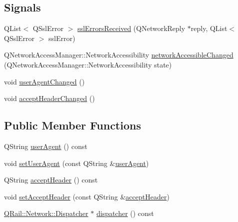 \subsection*{Signals}
\begin{DoxyCompactItemize}
\item 
Q\+List$<$ Q\+Ssl\+Error $>$ \mbox{\hyperlink{classQRail_1_1Network_1_1Manager_a0404bf0008a42108b6e72ec5da12d02f}{ssl\+Errors\+Received}} (Q\+Network\+Reply $\ast$reply, Q\+List$<$ Q\+Ssl\+Error $>$ ssl\+Error)
\item 
Q\+Network\+Access\+Manager\+::\+Network\+Accessibility \mbox{\hyperlink{classQRail_1_1Network_1_1Manager_af81d89d8572d74d039400ec2e05f9894}{network\+Accessible\+Changed}} (Q\+Network\+Access\+Manager\+::\+Network\+Accessibility state)
\item 
void \mbox{\hyperlink{classQRail_1_1Network_1_1Manager_a7041109a640094b8aaeb430e6b09c9bc}{user\+Agent\+Changed}} ()
\item 
void \mbox{\hyperlink{classQRail_1_1Network_1_1Manager_ab8a64dbadf3dbdb27c501e8b33e2eb05}{accept\+Header\+Changed}} ()
\end{DoxyCompactItemize}
\subsection*{Public Member Functions}
\begin{DoxyCompactItemize}
\item 
Q\+String \mbox{\hyperlink{classQRail_1_1Network_1_1Manager_a8163075df6f472c3ae69e0cfa67a7da7}{user\+Agent}} () const
\item 
void \mbox{\hyperlink{classQRail_1_1Network_1_1Manager_a35063d645223fad68f5b4ec56d5fbb96}{set\+User\+Agent}} (const Q\+String \&\mbox{\hyperlink{classQRail_1_1Network_1_1Manager_a8163075df6f472c3ae69e0cfa67a7da7}{user\+Agent}})
\item 
Q\+String \mbox{\hyperlink{classQRail_1_1Network_1_1Manager_a9917bfe2dda992fc8e31706f7cb475f6}{accept\+Header}} () const
\item 
void \mbox{\hyperlink{classQRail_1_1Network_1_1Manager_a932a587826e2eb8c3a73bed63731357a}{set\+Accept\+Header}} (const Q\+String \&\mbox{\hyperlink{classQRail_1_1Network_1_1Manager_a9917bfe2dda992fc8e31706f7cb475f6}{accept\+Header}})
\item 
\mbox{\hyperlink{classQRail_1_1Network_1_1Dispatcher}{Q\+Rail\+::\+Network\+::\+Dispatcher}} $\ast$ \mbox{\hyperlink{classQRail_1_1Network_1_1Manager_a21b6ceec7b0c085ffc74a9a2ced44688}{dispatcher}} () const
\end{DoxyCompactItemize}
